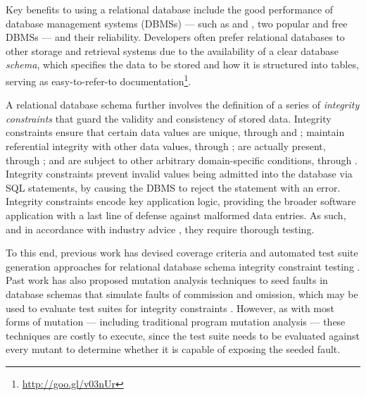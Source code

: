 Key benefits to using a relational database include the good performance of database management systems (DBMSs) \cite{Abrahami2015} --- such as \Postgres and \SQLite, two popular and free DBMSs --- and their reliability. Developers often prefer relational databases to other storage and retrieval systems due to the availability of a clear database {\it schema}, which specifies the data to be stored and how it is structured into tables, serving as easy-to-refer-to documentation\footnote{\small{\url{http://goo.gl/v03nUr}}}\hspace{-1ex}. %

\begin{sloppypar}
A relational database schema further involves the definition of a series of {\it integrity constraints} that guard the validity and consistency of stored data. Integrity constraints ensure that certain data values are unique, through \PKCs and \UCs; maintain referential integrity with other data values, through \FKCs; are actually present, through \NNCs; and are subject to other arbitrary domain-specific conditions, through \CCs. Integrity constraints prevent invalid values being admitted into the database via SQL \INSERT statements, by causing the DBMS to reject the statement with an error. Integrity constraints encode key application logic, providing the broader software application with a last line of defense against malformed data entries. As such, and in accordance with industry advice \cite{DzoneDatabaseTesting}, they require thorough testing.
\end{sloppypar}

To this end, previous work has devised coverage criteria and automated test suite generation approaches for relational database schema integrity constraint testing \cite{Kapfhammer2013,McMinn2015}. Past work has also proposed mutation analysis techniques to seed faults in database schemas that simulate faults of commission and omission, which may be used to evaluate test suites for integrity constraints \cite{Kapfhammer2007,Wright2013}.
%
However, as with most forms of mutation --- including traditional program mutation analysis --- these techniques are costly to execute, since the test suite needs to be evaluated against every mutant to determine whether it is capable of exposing the seeded fault.

